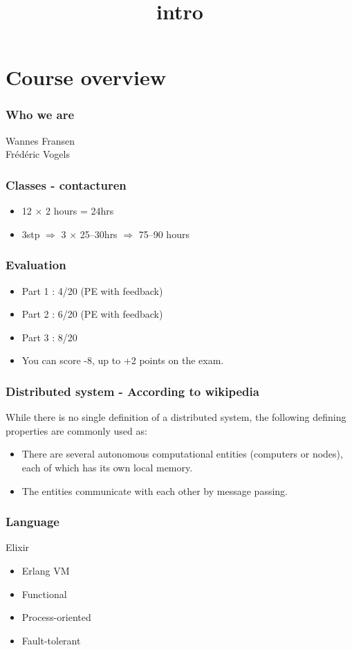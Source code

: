 \documentclass{ucll-slides}
\title{intro}
\begin{document}
\maketitle

\section{Course overview}

\begin{frame}
    \frametitle{Who we are}
    \begin{center} \large
        Wannes Fransen \\[4mm]
        Frédéric Vogels
    \end{center}
\end{frame}

\begin{frame}
    \frametitle{Classes - contacturen}
    \begin{itemize}
        \item 12 $\times$ 2 hours = 24hrs
        \item 3stp $\Rightarrow$ 3 $\times$ 25--30hrs $\Rightarrow$ 75--90 hours
    \end{itemize}
\end{frame}

\begin{frame}
    \frametitle{Evaluation}
    \begin{itemize}
        \item Part 1 : 4/20 (PE with feedback)
        \item Part 2 : 6/20 (PE with feedback)
        \item Part 3 : 8/20
    \end{itemize}
    \vskip4mm
    \begin{itemize}
        \item You can score -8, up to +2 points on the exam.
    \end{itemize}
\end{frame}

\begin{frame}
    \frametitle{Distributed system - According to wikipedia}

    While there is no single definition of a distributed system, the following defining properties are commonly used as:
    \begin{itemize}
        \item There are several autonomous computational entities (computers or nodes), each of which has its own local memory.
        \item The entities communicate with each other by message passing.
    \end{itemize}

\end{frame}

\begin{frame}
    \frametitle{Language}
    Elixir

    \begin{itemize}
        \item Erlang VM
        \item Functional
        \item Process-oriented
        \item Fault-tolerant
    \end{itemize}
\end{frame}
\end{document}
